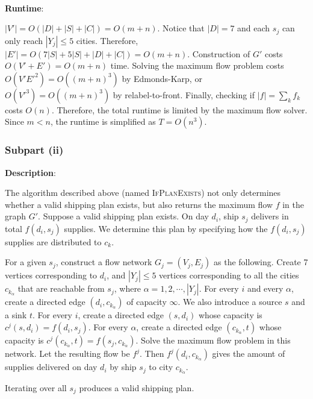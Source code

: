 \documentclass{article}
\begin{document}
~

\noindent\textbf{Runtime}:

$|V'|=O(|D|+|S|+|C|)=O(m+n)$. Notice that $|D|=7$ and each $s_j$ can only reach $|Y_j|\leqslant5$ cities. Therefore, $|E'|=O(7|S|+5|S|+|D|+|C|)=O(m+n)$. Construction of $G'$ costs $O(V'+E')=O(m+n)$ time. Solving the maximum flow problem costs $O(V'E'^2)=O((m+n)^3)$ by Edmonds-Karp, or $O(V'^3)=O((m+n)^3)$ by relabel-to-front. Finally, checking if $|f|=\sum_kf_k$ costs $O(n)$. Therefore, the total runtime is limited by the maximum flow solver. Since $m<n$, the runtime is simplified as $T=O(n^3)$.

\subsubsection{Subpart (ii)}
\noindent\textbf{Description}:

The algorithm described above (named \textsc{IfPlanExists}) not only determines whether a valid shipping plan exists, but also returns the maximum flow $f$ in the graph $G'$. Suppose a valid shipping plan
exists. On day $d_i$, ship $s_j$ delivers in total $f(d_i,s_j)$ supplies. We determine this plan by specifying how the $f(d_i,s_j)$ supplies are distributed to $c_k$.

For a given $s_j$, construct a flow network $G_j=(V_j,E_j)$ as the following. Create 7 vertices corresponding to $d_i$, and $|Y_j|\leqslant5$ vertices corresponding to all the cities $c_{k_\alpha}$ that are reachable from $s_j$, where $\alpha=1,2,\cdots,|Y_j|$. For every $i$ and every $\alpha$, create a directed edge $(d_i,c_{k_\alpha})$ of capacity $\infty$. We also introduce a source $s$ and a sink $t$. For every $i$, create a directed edge $(s,d_i)$ whose capacity is $c^j(s,d_i)=f(d_i,s_j)$. For every $\alpha$, create a directed edge $(c_{k_\alpha},t)$ whose capacity is $c^j(c_{k_\alpha},t)=f(s_j,c_{k_\alpha})$. Solve the maximum flow problem in this network. Let the resulting flow be $f^j$. Then $f^j(d_i,c_{k_\alpha})$ gives the amount of supplies delivered on day $d_i$ by ship $s_j$ to city $c_{k_\alpha}$.

Iterating over all $s_j$ produces a valid shipping plan.

\end{document}
